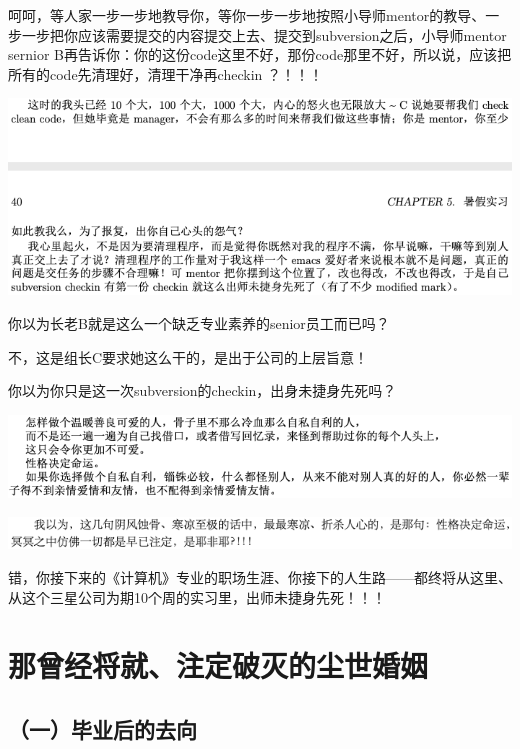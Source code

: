 \documentclass[9pt, b5paper]{article}
\begin{document}
呵呵，等人家一步一步地教导你，等你一步一步地按照小导师mentor的教导、一步一步把你应该需要提交的内容提交上去、提交到subversion之后，小导师mentor sernior B再告诉你：你的这份code这里不好，那份code那里不好，所以说，应该把所有的code先清理好，清理干净再checkin ？！！！

\begin{center}
\includegraphics[width=.9\linewidth]{./pic/backups_plans_20210505_140038.png}
\end{center}

你以为长老B就是这么一个缺乏专业素养的senior员工而已吗？

不，这是组长C要求她这么干的，是出于公司的上层旨意！

你以为你只是这一次subversion的checkin，出身未捷身先死吗？

\begin{center}
\includegraphics[width=.9\linewidth]{./pic/backups_plans_20210413_131623.png}
\end{center}

\begin{center}
\includegraphics[width=.9\linewidth]{./pic/backups_plans_20210505_140554.png}
\end{center}

错，你接下来的《计算机》专业的职场生涯、你接下的人生路——都终将从这里、从这个三星公司为期10个周的实习里，出师未捷身先死！！！

\section{那曾经将就、注定破灭的尘世婚姻}
\label{sec:orgb5f6802}

\subsection{（一）毕业后的去向}
\label{sec:org5ab20d9}
\end{document}
